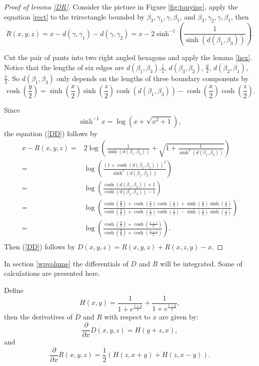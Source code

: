  \begin{proof}[Proof of lemma \ref{DR}]
 Consider the picture in Figure \ref{fig:touying}, apply the equation \ref{rect} to the trirectangle bounded by $\beta_3,\gamma_1,\gamma,\beta_1$, and $\beta_3,\gamma_2,\gamma,\beta_1$, then $$R(x,y,z)=x-d(\gamma,\gamma_1)-d(\gamma,\gamma_2)=x-2\sinh^{-1} \left(\frac{1}{\sinh(d(\beta_1,\beta_3))}\right).$$
 
 Cut the pair of pants into two right angled hexagons and apply the lemma \ref{hex}. Notice that the lengths of six edges are $d(\beta_1,\beta_3)$,$\frac{z}{2}$, $d(\beta_3,\beta_2)$, $\frac{y}{2}$, $d(\beta_2,\beta_1)$, $\frac{x}{2}.$ So $d(\beta_1,\beta_3)$ only depends on the lengths of three boundary components by 
 $$ 
 \cosh(\frac{y}{2})=\sinh(\frac{x}{2})\sinh(\frac{z}{2})\cosh(d(\beta_1,\beta_3))-\cosh(\frac{x}{2})\cosh(\frac{z}{2}).
 $$
 
 Since $$\sinh^{-1} x=\log \left(x+\sqrt{x^2+1}\right),$$ the equation (\ref{DD}) follows by  $$
 \begin{aligned}
 x-R(x,y,z)=&2\log\left(\frac{1}{\sinh(d(\beta_1,\beta_3))}+\sqrt{1+\frac{1}{\sinh^2(d(\beta_1,\beta_3))}}\right)\\
 =&\log\left(\frac{(1+\cosh(d(\beta_1,\beta_3)))^2}{\sinh^2(d(\beta_1,\beta_3))}\right)\\
 =&\log\left(\frac{\cosh(d(\beta_1,\beta_3))+1}{\cosh(d(\beta_1,\beta_3))-1}\right)\\
 =&\log\left(    \frac{
 \cosh(\frac{y}{2}) +\cosh(\frac{x}{2})\cosh(\frac{z}{2}) +\sinh(\frac{x}{2})\sinh(\frac{z}{2})     }
 {   \cosh(\frac{y}{2}) +\cosh(\frac{x}{2})\cosh(\frac{z}{2}) -\sinh(\frac{x}{2})\sinh(\frac{z}{2})   }  \right)\\
 =&\log\left(\frac{   \cosh(\frac{y}{2})+\cosh(\frac{x+z}{2})   }{  \cosh(\frac{y}{2}) +\cosh(\frac{x-z}{2})    }\right).\\
 \end{aligned}
 $$
Then (\ref{DD}) follows by $D(x,y,z)=R(x,y,z)+R(x,z,y)-x$.
 \end{proof}
 
 In section \ref{wpvolume} the differentials of $D$ and $R$ will be integrated. Some of calculations are presented here.
 
 \begin{lemma}\label{DRpp}
   Define $$H(x,y)=\frac{1}{1+e^{\frac{x+y}{2}}}+\frac{1}{1+e^{\frac{x-y}{2}}},$$ then the derivatives of $D$ and $R$  with respect to $x$ are  given by:
   \begin{equation}\label{pp1}
       \frac{\partial}{\partial x}D(x,y,z)=H(y+z,x),
   \end{equation}
    and 
    \begin{equation}\label{pp2}
        \frac{\partial }{\partial x }R(x,y,z)=\frac{1}{2}(H(z,x+y)+H(z,x-y)).
    \end{equation}
    
 \end{lemma}
 
